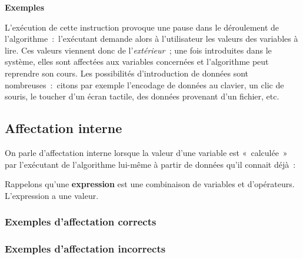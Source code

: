 			{\bfseries Exemples}
			
			
			L’exécution de cette instruction provoque une
			pause dans le déroulement de l’algorithme~:~l’exécutant demande alors à
			l’utilisateur les valeurs des variables à lire. Ces valeurs viennent
			donc de l’\textit{extérieur~}; une fois introduites dans le système,
			elles sont affectées aux variables concernées et l’algorithme peut
			reprendre son cours. 
			Les possibilités d’introduction de données 
			sont nombreuses~:~citons par exemple l’encodage de
			données au clavier, un clic de souris, le toucher d’un
			écran tactile, des données provenant d’un fichier, etc.

		\subsection{Affectation interne }

			On parle d’affectation interne lorsque la valeur d’une variable est
			«~calculée~» par l’exécutant de l’algorithme lui-même à partir de
			données qu’il connait déjà~:

			
			Rappelons qu’une \textbf{expression} 
			est une combinaison de variables et
			d’opérateurs. L’expression a une valeur.
			
			\subsubsection*{Exemples d’affectation corrects}
			
			
			\subsubsection*{Exemples d’affectation incorrects}
			
